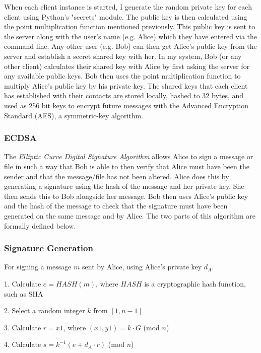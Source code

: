 \documentclass[12pt,a4paper]{article}
\begin{document}
When each client instance is started, I generate the random private key for each client using Python's "secrets" module. 
The public key is then calculated using the point multiplication function mentioned previously. 
This public key is sent to the server along with the user's name (e.g. Alice) which they have entered via the command line. 
Any other user (e.g. Bob) can then get Alice's public key from the server and establish a secret shared key with her. 
In my system, Bob (or any other client) calculates their shared key with Alice by first asking the server 
for any available public keys. 
Bob then uses the point multiplication function to multiply Alice's public key by his private key. 
The shared keys that each client has established with their contacts are stored locally, 
hashed to 32 bytes, and used as 256 bit keys to encrypt future messages with the Advanced Encryption Standard (AES), a symmetric-key algorithm. 

\subsubsection{ECDSA} \noindent \label{ECDSA}
The \emph{Elliptic Curve Digital Signature Algorithm} allows Alice to sign a message or file in such a way that Bob is able to then 
verify that Alice must have been the sender and that the message/file has not been altered. 
Alice does this by generating a signature using the hash of the message and her private key. 
She then sends this to Bob alongside her message. 
Bob then uses Alice's public key and the hash of the message to check that the signature must have been generated on the same message and by Alice. 
The two parts of this algorithm are formally defined below. 

\subsubsection{Signature Generation} \noindent \label{Signature Generation}
For signing a message $m$ sent by Alice, using Alice's private key $d_A$.

\vspace{1mm}

1. \space Calculate $e = HASH(m)$, where $HASH$ is a cryptographic hash function, such as SHA

2. \space Select a random integer $k$ from $[1,n-1]$

3. \space Calculate $r = x1$, where $(x1,y1) = k \cdot G$ (mod $n$)

4. \space Calculate $s = k^{-1}(e+d_A \cdot r)$ (mod $n$)
\end{document}
